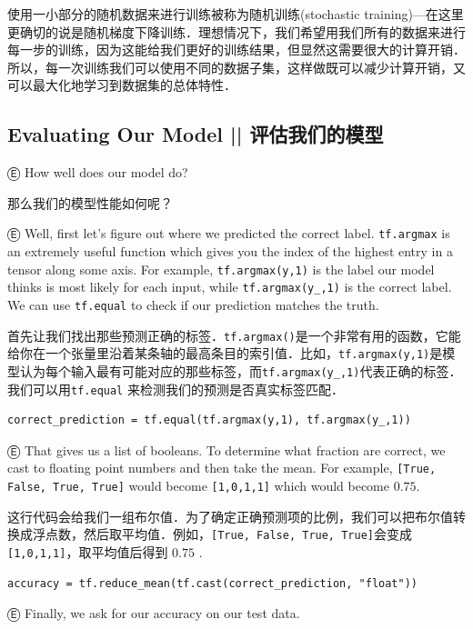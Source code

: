 使用一小部分的随机数据来进行训练被称为随机训练(stochastic training)---在这里更确切的说是随机梯度下降训练．理想情况下，我们希望用我们所有的数据来进行每一步的训练，因为这能给我们更好的训练结果，但显然这需要很大的计算开销．所以，每一次训练我们可以使用不同的数据子集，这样做既可以减少计算开销，又可以最大化地学习到数据集的总体特性．

\subsection{Evaluating Our Model   ||   评估我们的模型}

Ⓔ How well does our model do?

那么我们的模型性能如何呢？

Ⓔ Well, first let's figure out where we predicted the correct label. \lstinline{tf.argmax} is an extremely useful function which gives you the index of the highest entry in a tensor along some axis. For example, \lstinline{tf.argmax(y,1)} is the label our model thinks is most likely for each input, while \lstinline{tf.argmax(y_,1)} is the correct label. We can use \lstinline{tf.equal} to check if our prediction matches the truth.

首先让我们找出那些预测正确的标签．\lstinline{tf.argmax()}是一个非常有用的函数，它能给你在一个张量里沿着某条轴的最高条目的索引值．比如，\lstinline{tf.argmax(y,1)}是模型认为每个输入最有可能对应的那些标签，而\lstinline{tf.argmax(y_,1)}代表正确的标签．我们可以用\lstinline{tf.equal} 来检测我们的预测是否真实标签匹配．

\begin{lstlisting}
correct_prediction = tf.equal(tf.argmax(y,1), tf.argmax(y_,1))
\end{lstlisting}

Ⓔ That gives us a list of booleans. To determine what fraction are correct, we cast to floating point numbers and then take the mean. For example, \lstinline{[True, False, True, True]} would become \lstinline{[1,0,1,1]} which would become $0.75$.

这行代码会给我们一组布尔值．为了确定正确预测项的比例，我们可以把布尔值转换成浮点数，然后取平均值．例如，\lstinline{[True, False, True, True]}会变成\lstinline{[1,0,1,1]}，取平均值后得到 $0.75$ .

\begin{lstlisting}
accuracy = tf.reduce_mean(tf.cast(correct_prediction, "float"))
\end{lstlisting}

Ⓔ Finally, we ask for our accuracy on our test data.

